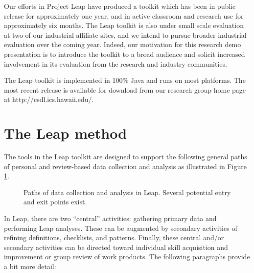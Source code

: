 Our efforts in Project Leap have produced a toolkit which has been in
public release for approximately one year, and in active classroom and
research use for approximately six months. The Leap toolkit is also under
small scale evaluation at two of our industrial affiliate sites, and we
intend to pursue broader industrial evaluation over the coming year. 
Indeed, our motivation for this research demo presentation is to 
introduce the toolkit to a broad audience and solicit increased 
involvement in its evaluation from the research and industry communities. 


The Leap toolkit is implemented in 100\% Java and runs on most platforms.
The most recent release is available for download from our research group
home page at http://csdl.ics.hawaii.edu/.


\section{The Leap method}

The tools in the Leap toolkit are designed to support the following general
paths of personal and review-based data collection and analysis as
illustrated in Figure \ref{cycle}.

\begin{figure} [tbp]
    {\centerline{}}
    \caption{\label{cycle} Paths of data collection
    and analysis in Leap. Several potential entry and exit
    points exist.}
\end{figure}

  
In Leap, there are two ``central'' activities: gathering primary data and
performing Leap analyses. These can be augmented by secondary activities of
refining definitions, checklists, and patterns. Finally, these central
and/or secondary activities can be directed toward individual skill
acquisition and improvement or group review of work products. The following 
paragraphs provide a bit more detail:

